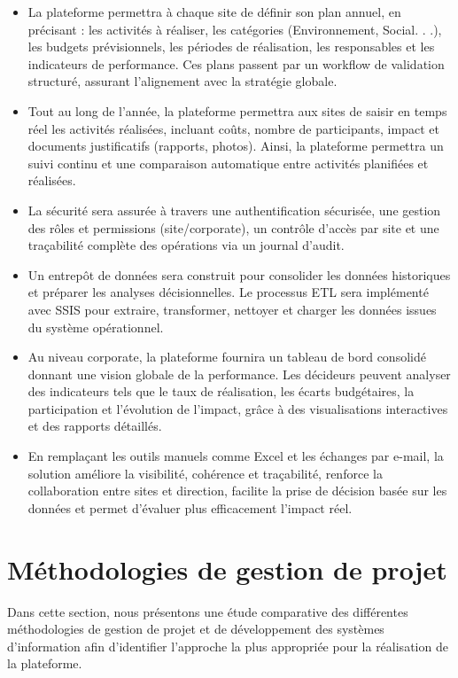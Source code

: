 \begin{itemize}[label=\textbullet, itemsep=0.15ex, parsep=0pt, topsep=0pt, partopsep=0pt]
  \item La plateforme permettra à chaque site de définir son plan annuel,  en précisant : les activités à réaliser, les catégories (Environnement, Social. . .), les budgets prévisionnels, les périodes de réalisation, les responsables et les indicateurs de performance. Ces plans passent par un workflow de validation structuré, assurant l’alignement avec la stratégie globale.
  \item Tout au long de l’année, la plateforme permettra aux sites de saisir en temps réel les activités réalisées, incluant coûts, nombre de participants, impact et documents justificatifs (rapports, photos). Ainsi, la plateforme permettra un suivi continu et une comparaison automatique entre activités planifiées et réalisées.
  \item La sécurité sera assurée à travers une authentification sécurisée, une gestion des rôles et permissions (site/corporate), un contrôle d’accès par site et une traçabilité complète des opérations via un journal d’audit.
  \item Un entrepôt de données sera construit pour consolider les données historiques et préparer les analyses décisionnelles. Le processus ETL sera implémenté avec SSIS pour extraire, transformer, nettoyer et charger les données issues du système opérationnel.
  \item Au niveau corporate, la plateforme fournira un tableau de bord consolidé donnant une vision globale de la performance. Les décideurs peuvent analyser des indicateurs tels que le taux de réalisation, les écarts budgétaires, la participation et l’évolution de l’impact, grâce à des visualisations interactives et des rapports détaillés.
  \item En remplaçant les outils manuels comme Excel et les échanges par e-mail, la solution améliore la visibilité, cohérence et traçabilité, renforce la collaboration entre sites et direction, facilite la prise de décision basée sur les données et permet d’évaluer plus efficacement l’impact réel.
\end{itemize}
\section{Méthodologies de gestion de projet}

Dans cette section, nous présentons une étude comparative des différentes méthodologies de gestion de projet et de développement des systèmes d’information afin d’identifier l’approche la plus appropriée pour la réalisation de la plateforme.


